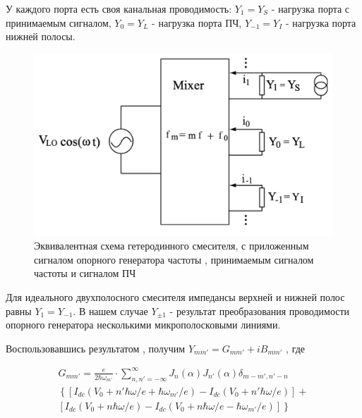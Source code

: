 \documentclass[a4paper]{article}
\begin{document}
У каждого порта есть своя канальная проводимость: $Y_1 = Y_S$ - нагрузка порта с принимаемым сигналом, $Y_0 = Y_L$ - нагрузка порта ПЧ, $Y_{-1}=Y_I$ - нагрузка порта нижней полосы.
\begin{figure}[H]
    \begin{center}
        \includegraphics[scale=0.5]{mixer_scheme.png}
        \caption{Эквивалентная схема гетеродинного смесителя, с приложенным сигналом опорного генератора частоты , принимаемым сигналом частоты  и сигналом ПЧ}
        \label{mixer_scheme}
    \end{center}
\end{figure}

Для  идеального двухполосного  смесителя  импедансы верхней и нижней полос равны $Y_1 = Y_{-1}$. В нашем случае $Y_{\pm 1}$ - результат преобразования проводимости  опорного генератора несколькими микрополосковыми линиями.
\par 

Воспользовавшись результатом \cite{Tucker}, получим $Y_{mm'} = G_{mm'} + i B_{mm'}$ , где

\begin{equation}
    \begin{split}
    G_{mm\prime} = \frac{e}{2 \hbar \omega_{m\prime}} 
    \cdot \sum_{n,n\prime=-\infty}^{\infty} J_n(\alpha) J_{n\prime}(\alpha) \delta_{m-m\prime, n\prime-n} \\
    \left\{ \left[ I_{dc}(V_0+n\prime \hbar \omega /e + \hbar \omega_{m\prime}/e) - 
    I_{dc}(V_0 + n\prime \hbar \omega/e) \right] + \right. \\
    \left. \left[ I_{dc}(V_0 + n\hbar \omega/e) - 
    I_{dc}(V_0 + n \hbar \omega/e - \hbar \omega_{m\prime}/e) \right]  \right\}
    \end{split}
\end{equation}
\end{document}
